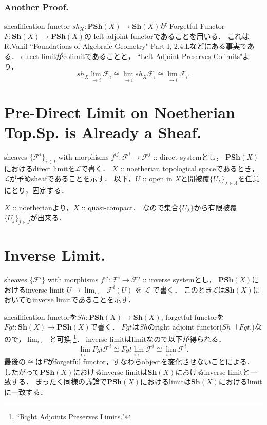 \documentclass[a4paper]{jsarticle}
\newcommand{\shF}{\mathcal{F}}
\newcommand{\shL}{\mathcal{L}}
\newcommand{\Sh}{\mathbf{Sh}}
\newcommand{\PSh}{\mathbf{PSh}}
\newcommand{\ftorSh}{\mathit{Sh}}
\newcommand{\ftorFgt}{\mathit{Fgt}}
\begin{document}
    \subsubsection{Another Proof.} \label{sssec:1-10-1}
    sheafification functor $sh_X: \PSh(X) \to \Sh(X)$が
    Forgetful Functor $F: \Sh(X) \to \PSh(X)$の
    left adjoint functorであることを用いる．
    これはR.Vakil ``Foundations of Algebraic Geometry" Part I, 2.4.Lなどにある事実である．
    direct limitがcolimitであることと，
    ``Left Adjoint Preserves Colimits"より，
    \[ sh_X \lim_{\to i} \shF_i \cong \lim_{\to i} sh_X \shF_i \cong \lim_{\to i} \shF_i. \]

\section{Pre-Direct Limit on Noetherian Top.Sp. is Already a Sheaf.} %
sheaves $\{\shF^i\}_{i \in I}$ with morphisms $f^{ij}: \shF^i \to \shF^j$ :: direct systemとし，
    $\PSh(X)$におけるdirect limitを$\shL$で書く．
    $X$ :: noetherian topological spaceであるとき，$\shL$が予めsheafであることを示す．
    以下，$U$ :: open in $X$と開被覆$\{U_{\lambda}\}_{\lambda \in \Lambda}$を任意にとり，固定する．

    $X$ :: noetherianより，$X$ :: quasi-compact．
    なので集合$\{U_{\lambda}\}$から有限被覆$\{ U_j \}_{j \in J}$が出来る．

\section{Inverse Limit.} %
    sheaves $\{\shF^i\}$ with morphisms $f^{ij}: \shF^i \to \shF^j$ :: inverse systemとし，
    $\PSh(X)$におけるinverse limit $U \mapsto \lim_{i \leftarrow} \shF^i(U)$ を $\shL$ で書く．
    このとき$\shL$は$\Sh(X)$においてもinverse limitであることを示す．
    
    sheafification functorを$\ftorSh: \PSh(X) \to \Sh(X)$, 
    forgetful functorを$\ftorFgt: \Sh(X) \to \PSh(X)$で書く．
    $\ftorFgt$は$\ftorSh$のright adjoint functor($\ftorSh \dashv \ftorFgt$.)なので，$\lim_{i \leftarrow}$と可換
    \footnote{``Right Adjoints Preserves Limits."}．
    inverse limitはlimitなので以下が得られる．
    \[ \lim_{i \leftarrow} \ftorFgt \shF^i \cong \ftorFgt \lim_{i \leftarrow} \shF^i \cong \lim_{i \leftarrow} \shF^i. \]
    最後の$\cong$は$F$がforgetful functor，すなわちobjectを変化させないことによる．
    したがって$\PSh(X)$におけるinverse limitは$\Sh(X)$におけるinverse limitと一致する．
    まったく同様の議論で$\PSh(X)$におけるlimitは$\Sh(X)$におけるlimitに一致する．
\end{document}

